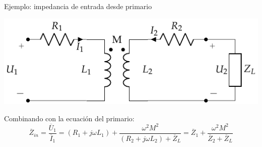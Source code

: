 \documentclass[aspectratio=169, usenames,svgnames,dvipsnames]{beamer}
\begin{document}
\begin{frame}[label={sec:orge4211ea}]{Ejemplo: impedancia de entrada desde primario}
\begin{center}
\includegraphics[height=0.45\textheight]{../figs/Trafo_Real_ImpSec.pdf}
\end{center}
Combinando con la ecuación del primario:
\[
  \overline{Z}_{in}  = \frac{\overline{U}_1}{\overline{I}_1} =  (R_1 + j \omega L_1) + \frac{\omega^2 M^2}{(R_2 + j \omega L_2) + \overline{Z}_L} = \overline{Z}_1 + \frac{\omega^2 M^2}{\overline{Z}_2 + \overline{Z}_L}
\]
\end{frame}
\end{document}
